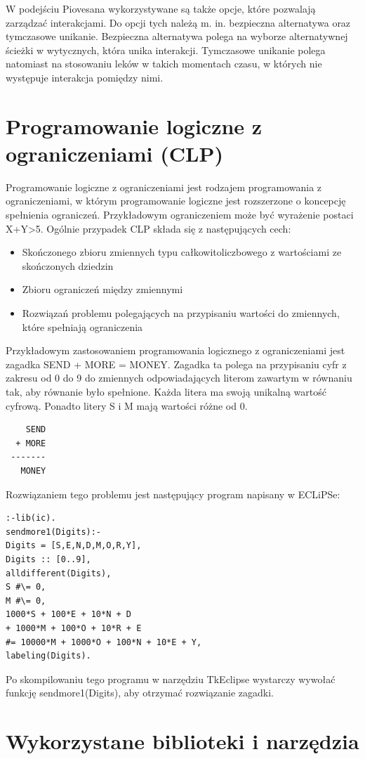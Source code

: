 \documentclass[oneside,a4paper]{book}
\begin{document}
\begin{spacing}{1.5}
W podejściu Piovesana wykorzystywane są także opcje, które pozwalają zarządzać interakcjami. Do opcji tych należą m. in. bezpieczna alternatywa oraz tymczasowe unikanie. Bezpieczna alternatywa polega na wyborze alternatywnej ścieżki w wytycznych, która unika interakcji. Tymczasowe unikanie polega natomiast na stosowaniu leków w takich momentach czasu, w których nie występuje interakcja pomiędzy nimi.

\chapter{Programowanie logiczne z ograniczeniami (CLP)}

Programowanie logiczne z ograniczeniami\cite{CLP} jest rodzajem programowania z ograniczeniami, w którym programowanie logiczne jest rozszerzone o koncepcję spełnienia ograniczeń. Przykładowym ograniczeniem może być wyrażenie postaci X+Y>5. 
Ogólnie przypadek CLP składa się z następujących cech:
\begin{itemize}
\item{Skończonego zbioru zmiennych typu całkowitoliczbowego z wartościami ze skończonych dziedzin}
\item{Zbioru ograniczeń między zmiennymi}
\item{Rozwiązań problemu polegających na przypisaniu wartości do zmiennych, które spełniają ograniczenia}
\end{itemize}
Przykładowym zastosowaniem programowania logicznego z ograniczeniami jest zagadka SEND + MORE  = MONEY.\cite{Eclipse} Zagadka ta polega na przypisaniu cyfr z zakresu od 0 do 9 do zmiennych odpowiadających literom zawartym w równaniu tak, aby równanie było spełnione. Każda litera ma swoją unikalną wartość cyfrową. Ponadto litery S i M mają wartości różne od 0.
\begin{verbatim}
    SEND
  + MORE
 -------
   MONEY
\end{verbatim}
\newpage
Rozwiązaniem tego problemu jest następujący program napisany w ECLiPSe:
\begin{verbatim}
:-lib(ic).
sendmore1(Digits):-
Digits = [S,E,N,D,M,O,R,Y],
Digits :: [0..9],
alldifferent(Digits),
S #\= 0,
M #\= 0,
1000*S + 100*E + 10*N + D
+ 1000*M + 100*O + 10*R + E
#= 10000*M + 1000*O + 100*N + 10*E + Y,
labeling(Digits).
\end{verbatim}
Po skompilowaniu tego programu w narzędziu TkEclipse wystarczy wywołać funkcję sendmore1(Digits), aby otrzymać rozwiązanie zagadki.


\chapter{Wykorzystane biblioteki i narzędzia}


\end{spacing}
\end{document}
